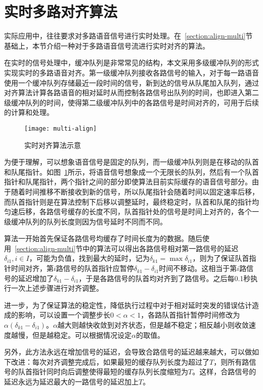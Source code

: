 \section{实时多路对齐算法} \label{section:realtime-align}

实际应用中，往往要求对多路语音信号进行实时处理。在~\ref{section:align-multi}节基础上，本节介绍一种对于多路语音信号流进行实时对齐的算法。

在实时的信号处理中，缓冲队列是非常常见的结构，本文采用多级缓冲队列的形式实现实时的多路语音对齐。第一级缓冲队列接收各路信号的输入，对于每一路语音使用一个缓冲队列存储最近一段时间的信号，新到达的信号从队尾加入队列，通过对齐算法计算各路语音的相对延时从而控制各路信号出队列的时间，也即进入第二级缓冲队列的时间，使得第二级缓冲队列中的各路信号是时间对齐的，可用于后续的计算和处理。

\begin{figure}
\centering
\texttt{[image: multi-align]}
\caption{实时对齐算法示意\label{fig:multi-align}}
\end{figure}

为便于理解，可以想象语音信号是固定的队列，而一级缓冲队列则是在移动的队首和队尾指针。如图~\ref{fig:multi-align}所示，将语音信号想象成一个无限长的队列，然后有一个队首指针和队尾指针，两个指针之间的部分即使算法目前实际缓存的语音信号部分。由于随着时间推移不断接收到新的信号，所以队尾指针会随着时间以固定速率后移，而队首指针则是在算法控制下后移以调整延时，最终稳定时，队首和队尾的指针均匀速后移，各路信号缓存的长度不同，队首指针处的信号是时间上对齐的，各个一级缓冲队列的队列长度则因为信号延时不同而不同。

算法一开始首先保证各路信号均缓存了时间长度为的数据。随后使用~\ref{section:align-multi}节中的算法可以得出各路信号相对第一路信号的延迟$\delta_{i1}, i \in I$，可能为负值，找到最大的延时，记为$\delta_{k1} = \max \delta_{i1}$，则为了保证队首指针时间对齐，第$i$路信号的队首指针应暂停$\delta_{k1}-\delta_{i1}$时间不移动。这相当于第$i$路信号的延迟增加了$\delta_{k1}-\delta_{i1}$，于是各路信号的队首均对齐到了路信号。之后每0.1秒执行一次上述步骤进行对齐调整。

进一步，为了保证算法的稳定性，降低执行过程中对于相对延时突发的错误估计造成的影响，可以设置一个调整步长$0<\alpha<1$，各路队首指针暂停时间修改为$\alpha(\delta_{k1}-\delta_{i1})$。$\alpha$越大则越快收敛到对齐状态，但是越不稳定；相反越小则收敛速度越慢，但是越稳定。可以根据情况设定$\alpha$的取值。

另外，此方法永远在增加信号的延迟，会导致合路信号的延迟越来越大，可以做如下改进：每次对齐调整完成后，如果最短的缓存队列长度为超过了$T$，则所有路信号的队首指针同时向后调整使得最短的缓存队列长度缩短为$T$。这样，合路信号的延迟永远为延迟最大的一路信号的延迟加上$T$。

